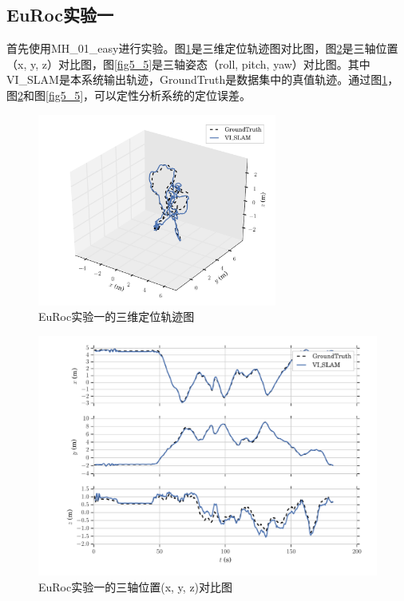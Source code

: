 \subsection{EuRoc实验一}
首先使用MH\_01\_easy进行实验。图\ref{fig5_3}是三维定位轨迹图对比图，图\ref{fig5_4}是三轴位置（x, y, z）对比图，图\ref{fig5_5}是三轴姿态（roll, pitch, yaw）对比图。其中VI\_SLAM是本系统输出轨迹，GroundTruth是数据集中的真值轨迹。通过图\ref{fig5_3}，图\ref{fig5_4}和图\ref{fig5_5}，可以定性分析系统的定位误差。
\begin{figure}
	\centering
	\includegraphics[width=0.7\textwidth]{figures/chapter5/traject_mh01}
	\caption{EuRoc实验一的三维定位轨迹图}\label{fig5_3}
\end{figure}
\begin{figure}
	\centering
	\includegraphics[width=1.0\textwidth]{figures/chapter5/xyz_mh01}
	\caption{EuRoc实验一的三轴位置(x, y, z)对比图}\label{fig5_4}
\end{figure}
